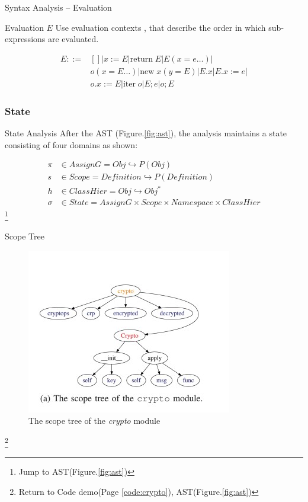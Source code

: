 \documentclass[9pt, xcolor=table]{beamer}
\begin{document}
\begin{frame}{Syntax Analysis -- Evaluation}
	\begin{block}{Evaluation $E$}
		Use evaluation contexts \cite{felleisen2009semantics}, \cite{madsen2017model} that describe the order in which sub-expressions are evaluated.
	\end{block}
	\begin{align*}
		E ::= & \left[ \right]|x:= E|\text{return} \; E|E(x=e\ldots)| \\
			  & o(x=E\ldots)| \text{new}\; x(y=E)| E.x | E.x:=e| \\
			  & o.x:=E|\text{iter}\; o |E;e|o;E
	\end{align*}		
\end{frame}
%
\subsubsection{State}
\begin{frame}{State Analysis}
	\vfill
	After the AST (Figure.\ref{fig:ast}), the analysis maintains a state consisting of four domains as shown:

	\begin{align*}
		\pi &\in AssignG =  Obj \hookrightarrow P(Obj) \\
		s &\in Scope = Definition \hookrightarrow P(Definition) \\
		h &\in ClassHier = Obj \hookrightarrow Obj^{*} \\
		\sigma &\in State = AssignG \times Scope \times Namespace \times ClassHier
	\end{align*}
	\footnote{Jump to AST(Figure.\ref{fig:ast})}
\end{frame}
%
%
\begin{frame}{Scope Tree}\label{frame:scope_tree}
	\begin{figure}
		\centering
		\includegraphics[height=0.5\paperheight]{scope_tree.jpg}
		\caption{The scope tree of the \textit{crypto} module}
		\label{fig:scope_tree}
	\end{figure} 
	\footnote{Return to Code demo(Page \ref{code:crypto}), AST(Figure.\ref{fig:ast})}
\end{frame}
\end{document}
